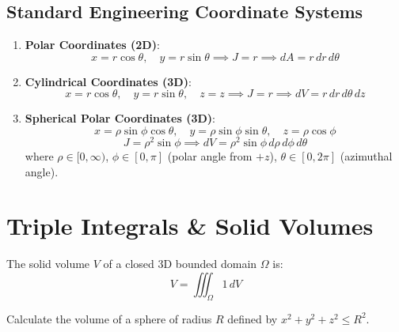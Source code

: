 \subsection{Standard Engineering Coordinate Systems}
\begin{enumerate}[leftmargin=1.5em]
    \item \textbf{Polar Coordinates (2D)}:
    \begin{equation}
    x = r\cos\theta, \quad y = r\sin\theta \implies J = r \implies dA = r\,dr\,d\theta
    \end{equation}
    \item \textbf{Cylindrical Coordinates (3D)}:
    \begin{equation}
    x = r\cos\theta, \quad y = r\sin\theta, \quad z = z \implies J = r \implies dV = r\,dr\,d\theta\,dz
    \end{equation}
    \item \textbf{Spherical Polar Coordinates (3D)}:
    \begin{equation}
    x = \rho\sin\phi\cos\theta, \quad y = \rho\sin\phi\sin\theta, \quad z = \rho\cos\phi
    \end{equation}
    \begin{equation}
    J = \rho^2 \sin\phi \implies dV = \rho^2 \sin\phi\,d\rho\,d\phi\,d\theta
    \end{equation}
    where $\rho \in [0, \infty)$, $\phi \in [0, \pi]$ (polar angle from $+z$), $\theta \in [0, 2\pi]$ (azimuthal angle).
\end{enumerate}

\section{Triple Integrals \& Solid Volumes}

\begin{definition}
The solid volume $V$ of a closed 3D bounded domain $\Omega$ is:
\begin{equation}
V = \iiint_\Omega 1\,dV
\end{equation}
\end{definition}

\begin{example}
Calculate the volume of a sphere of radius $R$ defined by $x^2 + y^2 + z^2 \le R^2$.
\end{example}

